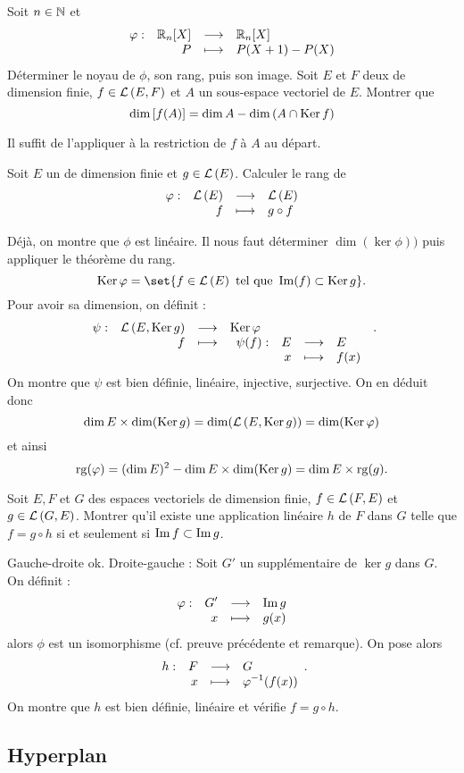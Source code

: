 \documentclass{magnolia}
\begin{document}
\begin{exos}
\exo Soit $n\in\N$ et
  \[\dspappli{\phi}{\polyR[n]}{\polyR[n]}{P}{P(X+1)-P(X)}\]
  Déterminer le noyau de $\phi$, son rang, puis son image.
\exo Soit $E$ et $F$ deux \Kevs de dimension finie, $f\in\lin{E}{F}$ et $A$
  un sous-espace vectoriel de $E$. Montrer que
  \[\dim\cro{f(A)}=\dim A-\dim\p{A\cap\ker f}\]
  \begin{sol}
  Il suffit de l'appliquer à la restriction de $f$ à $A$ au départ.
  \end{sol}
\exo Soit $E$ un \Kev de dimension finie et $g\in\Endo{E}$. Calculer le rang de
  \[\dspappli{\phi}{\Endo{E}}{\Endo{E}}{f}{g\circ f}\]
  \begin{sol}
  Déjà, on montre que $\phi$ est linéaire. Il nous faut déterminer $\dim(\ker\phi))$ puis appliquer le théorème du rang. 
  $$\ker \phi=\set{f\in \Endo{E} \text{ tel que } \im(f)\subset \ker g}.$$ Pour avoir sa dimension, on définit :
  $$\dspappli{\psi}{\lin{E}{\ker g}}{\ker \phi}{f}{\dspappli{\psi(f)}{E}{E}{x}{f(x)}}.$$
  On montre que $\psi$ est bien définie, linéaire, injective, surjective. On en déduit donc $$\dim E\times\dim(\ker g)=\dim(\lin{E}{\ker g})=\dim(\ker\phi)$$ et ainsi $$\rg(\phi)=(\dim E)^2-\dim E\times\dim(\ker g)=\dim E \times \rg(g).$$
  \end{sol}
\exo Soit $E,F$ et $G$ des espaces vectoriels de dimension finie,
  $f\in\lin{F}{E}$ et $g\in\lin{G}{E}$. Montrer qu'il existe une application
  linéaire $h$ de $F$ dans $G$ telle que $f=g\circ h$ si et seulement si
  $\im f\subset\im g$.  
  \begin{sol}
  Gauche-droite ok. Droite-gauche :
  Soit $G'$ un supplémentaire de $\ker g$ dans $G$. On définit :
  $$\dspappli{\phi}{G'}{\im g}{x}{g(x)}$$ alors $\phi$ est un isomorphisme (cf. preuve précédente et remarque). On pose alors $$\dspappli{h}{F}{G}{x}{\phi^{-1}(f(x))}.$$ On montre que $h$ est bien définie, linéaire et vérifie $f=g\circ h$.
  \end{sol}
\end{exos}

\subsection{Hyperplan}
\end{document}
